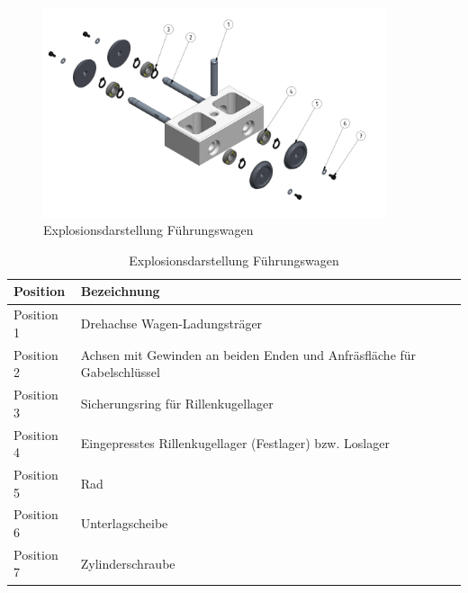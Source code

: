 \documentclass[../../main.tex]{subfiles}
\begin{document}
     \begin{figure}[H] %
        \centering
        \includegraphics[width=0.9\textwidth]{Fuehrungswagen.png}
        \caption{Explosionsdarstellung Führungswagen}
        \label{fig:expl_fuehrungswagen}
    \end{figure}

    \begin{table}[H] \centering
        \begin{tabular}{|l|l|}
        \hline
        \textbf{Position} & \textbf{Bezeichnung}\\
        \hline
        Position 1          & Drehachse Wagen-Ladungsträger\\
         \hline
        Position 2          & Achsen mit Gewinden an beiden Enden und Anfräsfläche für Gabelschlüssel\\
         \hline
        Position 3          & Sicherungsring für Rillenkugellager\\
        \hline
        Position 4          & Eingepresstes Rillenkugellager (Festlager) bzw. Loslager\\
        \hline
        Position 5          & Rad\\
        \hline
        Position 6          & Unterlagscheibe\\
        \hline
        Position 7          & Zylinderschraube\\
        \hline
        \end{tabular}

        \caption{Explosionsdarstellung Führungswagen}
        \label{tab:expl_fuehrungswagen}
        \end{table}
    \newpage
\end{document}
